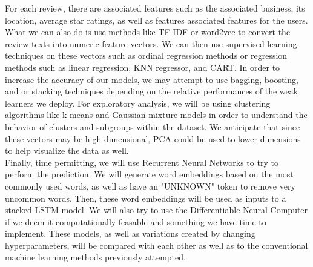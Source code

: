 \documentclass[12pt]{article}
\theoremstyle{plain}
\theoremstyle{definition}
\theoremstyle{remark}
\begin{document}
For each review, there are associated features such as the associated business, its location, average star ratings, as well as features associated features for the users. What we can also do is use methods like TF-IDF or word2vec to convert the review texts into numeric feature vectors. We can then use supervised learning techniques on these vectors such as ordinal regression methods or regression methods such as linear regression, KNN regressor, and CART. In order to increase the accuracy of our models, we may attempt to use bagging, boosting, and or stacking techniques depending on the relative performances of the weak learners we deploy. For exploratory analysis, we will be using clustering algorithms like k-means and Gaussian mixture models in order to understand the behavior of clusters and subgroups within the dataset. We anticipate that since these vectors may be high-dimensional, PCA could be used to lower dimensions to help visualize the data as well.  \\

Finally, time permitting, we will use Recurrent Neural Networks to try to perform the prediction. We will generate word embeddings based on the most commonly used words, as well as have an "UNKNOWN" token to remove very uncommon words. Then, these word embeddings will be used as inputs to a stacked LSTM model.  We will also try to use the Differentiable Neural Computer if we deem it computationally feasable and something we have time to implement. These models, as well as variations created by changing hyperparameters, will be compared with each other as well as to the conventional machine learning methods previously attempted. 
\end{document}
